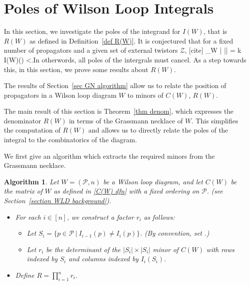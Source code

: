 \documentclass[11pt]{article}
\newcommand{\hlfix}[2]{\texthl{#1}\todo{#2}}
\def\bas #1\eas{\begin{align*} #1 \end{align*}}
\newcommand{\cP}{\mathcal{P}}
\newcommand{\cZ}{\mathcal{Z}}
\newtheorem{algorithm}[thm]{Algorithm}
\theoremstyle{remark}
\theoremstyle{definition}
\begin{document}
\section{Poles of Wilson Loop Integrals}\label{sec poles}

In this section, we investigate the poles of the integrand for $I(W)$, that is $R(W)$ as defined in Definition~\ref{def R(W)}. It is conjectured that for a fixed number of propagators and a given set of external twistors $\cZ$, [cite] \bas \sum_{W | |\cP| = k} I(W)(\cZ) <\infty \;.\eas In otherwords, all poles of the intergrals must cancel. As a step towards this, in this section, we prove some results about $R(W)$.

The results of Section~\ref{sec GN algorithm} allow us to relate the position of propagators in a Wilson loop diagram $W$ to minors of $C(W)$, $R(W)$.

The main result of this section is Theorem~\ref{thm denom}, which expresses the denominator $R(W)$ in terms of the Grassmann necklace of $W$. This simplifies the computation of $R(W)$ and allows us to directly relate the poles of the integral to the combinatorics of the diagram.

We first give an algorithm which extracts the required minors from the Grassmann necklace. 


\begin{algorithm}\label{alg WLD to denom via GN}
Let $W = (\cP,n)$ be a Wilson loop diagram, and let $C(W)$ be the matrix of $W$ as defined in \eqref{C(W) dfn} with a fixed ordering on $\cP$. (see Section~\ref{section WLD background}).
\begin{itemize}
  \item For each $i \in [n]$, we construct a factor $r_i$ as follows:
    \begin{itemize}
      \item Let $S_i = \{p \in \cP \ | \ I_{i-1}(p) \neq I_i(p)\}$. (By convention, set \hlfix{$I_{0} = I_n$}{changed. correct?}.)
      \item Let $r_i$ be the determinant of the $|S_i|\times |S_i|$ minor of $C(W)$ with rows indexed by $S_i$ and columns indexed by $I_i(S_i)$.  %
    \end{itemize}
  \item Define $R = \prod_{i=1}^n r_i$.
\end{itemize}
\end{algorithm}
\end{document}
